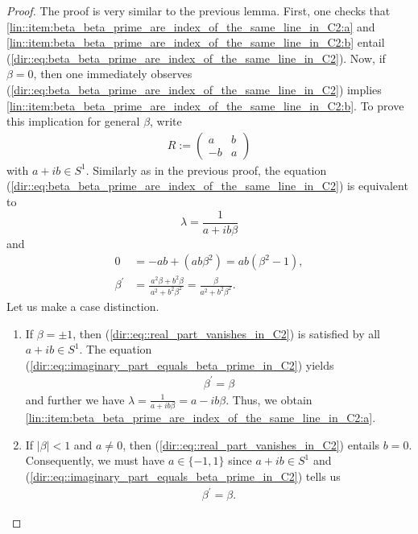 \documentclass{amsart}
\begin{document}
\begin{proof}
    The proof is very similar to the previous lemma. First, one checks that \ref{lin::item:beta_beta_prime_are_index_of_the_same_line_in_C2:a} and \ref{lin::item:beta_beta_prime_are_index_of_the_same_line_in_C2:b} entail (\ref{dir::eq:beta_beta_prime_are_index_of_the_same_line_in_C2}). Now, if $\beta = 0$, then one immediately observes (\ref{dir::eq:beta_beta_prime_are_index_of_the_same_line_in_C2}) implies \ref{lin::item:beta_beta_prime_are_index_of_the_same_line_in_C2:b}. To prove this implication for general $\beta$, write 
    \begin{align*}
        R := \begin{pmatrix}
             a & b \\
            -b & a
        \end{pmatrix}
    \end{align*}
    with $a + ib \in S^1$. Similarly as in the previous proof, the equation (\ref{dir::eq:beta_beta_prime_are_index_of_the_same_line_in_C2}) is equivalent to 
    $$
    \lambda = \frac{1}{a+ib \beta}
    $$ 
    and
    \begin{align}
        \label{dir::eq::real_part_vanishes_in_C2} 
        0 &= - ab  + (ab \beta^2) = ab (\beta^2 - 1), \\
        \label{dir::eq::imaginary_part_equals_beta_prime_in_C2}
        \beta^\prime &= \frac{\ a^2 \beta +  b^2 \beta}{a^2 + b^2 \beta^2} = \frac{\beta}{a^2 + b^2 \beta^2}.
    \end{align}
    Let us make a case distinction.
    \begin{enumerate}
        \item If $\beta = \pm 1$, then (\ref{dir::eq::real_part_vanishes_in_C2}) is satisfied by all $a+ib \in S^1$. The equation (\ref{dir::eq::imaginary_part_equals_beta_prime_in_C2}) yields
        \begin{align*}
            \beta^\prime = \beta
        \end{align*}
        and further we have $\lambda = \frac{1}{a + ib \beta} = a - ib\beta$.
        Thus, we obtain \ref{lin::item:beta_beta_prime_are_index_of_the_same_line_in_C2:a}.
        \item If $|\beta| < 1$ and $a \neq 0$, then (\ref{dir::eq::real_part_vanishes_in_C2}) entails $b = 0$. Consequently, we must have $a \in \{-1,1\}$ since $a+ib \in S^1$ and (\ref{dir::eq::imaginary_part_equals_beta_prime_in_C2}) tells us
        \begin{align*}
            \beta^\prime = \beta.

\end{align*}
\end{enumerate}
\end{proof}
\end{document}
